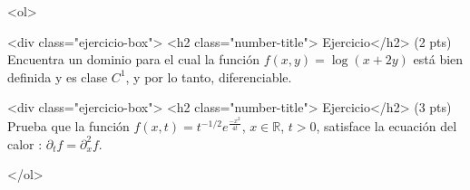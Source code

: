 \documentclass[12pt]{article}
\begin{document}
\bigskip

            
\bigskip
\bigskip
\bigskip


<ol>

  
<div class="ejercicio-box"> <h2 class="number-title"> Ejercicio</h2> (2 pts) Encuentra un dominio para el cual la función
  $f(x,y)=\log(x+2y)$ está bien definida y
  es clase $C^1$, y por lo tanto, diferenciable.


  
\vspace{4cm}  


<div class="ejercicio-box"> <h2 class="number-title"> Ejercicio</h2> (3 pts) Prueba que la función
  $f(x,t)=t^{-1/2}e^{\frac{-x^2}{4t}}$, $x\in \mathbb{R}$, $t>0$,
  satisface la ecuación del calor : $\partial_t f= \partial_x^2f$.


</ol>


  
\end{document}
